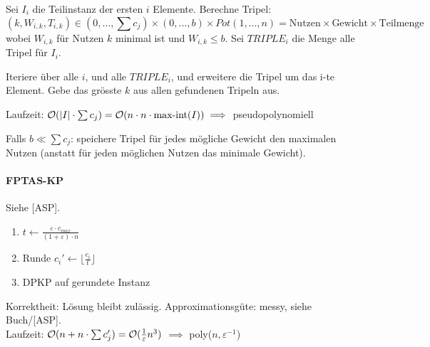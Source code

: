 Sei $I_i$ die Teilinstanz der ersten $i$ Elemente.
Berechne Tripel:
$$ (k, W_{i,k}, T_{i,k}) \in (0, ..., \sum c_j) \times (0, ..., b) \times Pot({1, ..., n})
    = \text{Nutzen} \times \text{Gewicht} \times \text{Teilmenge} $$
wobei $W_{i,k}$ für Nutzen $k$ minimal ist und $W_{i,k} \leq b$.
Sei $TRIPLE_i$ die Menge alle Tripel für $I_i$.

Iteriere über alle $i$, und alle $TRIPLE_i$, und erweitere die Tripel um das i-te Element.
Gebe das grösste $k$ aus allen gefundenen Tripeln aus.

Laufzeit: $\mathcal{O}(|I| \cdot \sum c_j) = \mathcal{O}(n \cdot n \cdot \text{max-int}(I)) \implies$ pseudopolynomiell

Falls $b \ll \sum c_j$: speichere Tripel für jedes mögliche Gewicht den maximalen Nutzen
(anstatt für jeden möglichen Nutzen das minimale Gewicht).

\paragraph{FPTAS-KP}
Siehe [ASP].

\begin{enumerate}
    \item $t \gets \frac{\varepsilon \cdot c_{max}}{(1+\varepsilon)\cdot n}$
    \item Runde $c_i' \gets \lfloor \frac{c_i}{t} \rfloor$
    \item DPKP auf gerundete Instanz
\end{enumerate}
Korrektheit: Lösung bleibt zulässig.
Approximationsgüte: messy, siehe Buch/[ASP].\\
Laufzeit: $\mathcal{O} (n + n \cdot \sum c_j') = \mathcal{O} (\frac{1}{\varepsilon}n^3)$
$\implies$ poly($n, \varepsilon^{-1}$)

